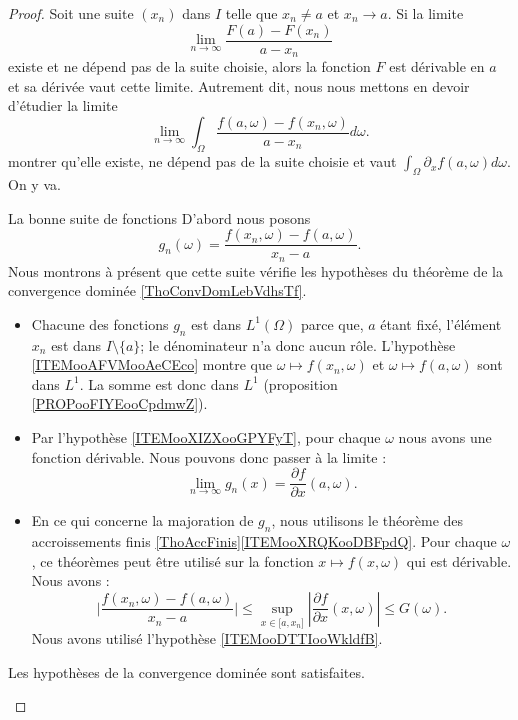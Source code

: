 \begin{proof}
	Soit une suite \( (x_n)\) dans \( I\) telle que \( x_n\neq a\) et \( x_n\to a\). Si la limite
	\begin{equation}
		\lim_{n\to \infty} \frac{ F(a)-F(x_n) }{ a-x_n }
	\end{equation}
	existe et ne dépend pas de la suite choisie, alors la fonction \( F\) est dérivable en \( a\) et sa dérivée vaut cette limite. Autrement dit, nous nous mettons en devoir d'étudier la limite
	\begin{equation}    \label{EqLIiralx}
		\lim_{n\to \infty} \int_{\Omega}\frac{ f(a,\omega)-f(x_n,\omega) }{ a-x_n }d\omega.
	\end{equation}
	montrer qu'elle existe, ne dépend pas de la suite choisie et vaut \( \int_{\Omega}\partial_xf(a,\omega)d\omega\). On y va.

	\begin{subproof}
		\item[La bonne suite de fonctions]
		D'abord nous posons
		\begin{equation}    \label{EqAFOUbQB}
			g_n(\omega)=\frac{ f(x_n,\omega)-f(a,\omega) }{ x_n-a }.
		\end{equation}
		Nous montrons à présent que cette suite vérifie les hypothèses du théorème de la convergence dominée \ref{ThoConvDomLebVdhsTf}.
		\begin{itemize}
			\item
			      Chacune des fonctions \( g_n\) est dans \( L^1(\Omega)\) parce que, \( a\) étant fixé, l'élément \( x_n\) est dans \( I\setminus\{ a \}\); le dénominateur n'a donc aucun rôle. L'hypothèse \ref{ITEMooAFVMooAeCEco} montre que \( \omega\mapsto f(x_n,\omega)\) et \( \omega\mapsto f(a,\omega)\) sont dans \( L^1\). La somme est donc dans \( L^1\) (proposition \ref{PROPooFIYEooCpdmwZ}).
			\item
			      Par l'hypothèse \ref{ITEMooXIZXooGPYFyT}, pour chaque \( \omega\) nous avons une fonction dérivable. Nous pouvons donc passer à la limite :
			      \begin{equation}
				      \lim_{n\to \infty} g_n(x)=\frac{ \partial f }{ \partial x }(a,\omega).
			      \end{equation}
			\item
			      En ce qui concerne la majoration de \( g_n\), nous utilisons le théorème des accroissements finis \ref{ThoAccFinis}\ref{ITEMooXRQKooDBFpdQ}. Pour chaque \( \omega\), ce théorèmes peut être utilisé sur la fonction \( x\mapsto f(x,\omega)\) qui est dérivable. Nous avons :
			      \begin{equation}
				      \big| \frac{  f(x_n,\omega)-f(a,\omega)   }{ x_n-a  } \big|\leq \sup_{x\in \mathopen[ a , x_n \mathclose]}| \frac{ \partial f }{ \partial x }(x,\omega) |\leq G(\omega).
			      \end{equation}
			      Nous avons utilisé l'hypothèse \ref{ITEMooDTTIooWkldfB}.
		\end{itemize}
		Les hypothèses de la convergence dominée sont satisfaites.


\end{subproof}
\end{proof}
